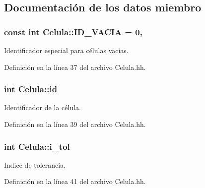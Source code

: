\subsection{Documentación de los datos miembro}
\hypertarget{class_celula_affff67b41ead0b1f3a3f4faad6c049ac}{
\subsubsection[{I\+D\+\_\+\+V\+A\+C\+I\+A}]{\setlength{\rightskip}{0pt plus 5cm}const int Celula\+::\+I\+D\+\_\+\+V\+A\+C\+I\+A = 0\hspace{0.3cm}{\ttfamily [static]}, {\ttfamily [private]}}}\label{class_celula_affff67b41ead0b1f3a3f4faad6c049ac}


Identificador especial para células vacias. 



Definición en la línea 37 del archivo Celula.\+hh.

\hypertarget{class_celula_a0984a8b3deeed4979ed6f6141edc3c0c}{
\subsubsection[{id}]{\setlength{\rightskip}{0pt plus 5cm}int Celula\+::id\hspace{0.3cm}{\ttfamily [private]}}}\label{class_celula_a0984a8b3deeed4979ed6f6141edc3c0c}


Identificador de la célula. 



Definición en la línea 39 del archivo Celula.\+hh.

\hypertarget{class_celula_abda46be7b30a13909d9819c46238080b}{
\subsubsection[{i\+\_\+tol}]{\setlength{\rightskip}{0pt plus 5cm}int Celula\+::i\+\_\+tol\hspace{0.3cm}{\ttfamily [private]}}}\label{class_celula_abda46be7b30a13909d9819c46238080b}


Indice de tolerancia. 



Definición en la línea 41 del archivo Celula.\+hh.


